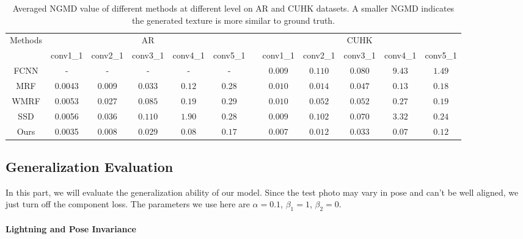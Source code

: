 \documentclass[10pt,twocolumn,letterpaper]{article}
\begin{document}
\begin{table}[htbp]
\begin{center}
{\small
\begin{tabular}{ccccccccccccc}
\hline
\multicolumn{2}{c|}{\multirow {2}{*}{Methods}} &\multicolumn{5}{c}{AR} & & \multicolumn{5}{c}{CUHK} \\
\cline{3-7} \cline{9-13} \multicolumn{2}{c|}{} & conv1\_1 & conv2\_1 & conv3\_1 & conv4\_1 & conv5\_1 & &
 conv1\_1 & conv2\_1 & conv3\_1 & conv4\_1 & conv5\_1  \\
\hline
\multicolumn{2}{c|}{FCNN} & - & - & - & - & - & & { $0.009$} &{ $0.110$} & {$0.080$} & {$9.43$} & {$1.49$}  \\
\multicolumn{2}{c|}{MRF} & 0.0043 & 0.009 & {$0.033$}  & {$0.12$} & 0.28 & & { $0.010$} &{ $0.014$} & {$0.047$} & $0.13$ & $0.18$  \\
\multicolumn{2}{c|}{WMRF} & 0.0053 & 0.027 & {$0.085$}  & {$0.19$} & 0.29 & & { $0.010$} &{ $0.052$} & {$0.052$} & {$0.27$} & {$0.19$}  \\
\multicolumn{2}{c|}{SSD} & 0.0056 & 0.036 & {$0.110$} & {$1.90$} & 0.28 & & { $0.009$} &{ $0.102$} & {$0.070$} & {$3.32$} & {$0.24$}  \\
\multicolumn{2}{c|}{Ours} & {\color{red} 0.0035} & {\color{red} 0.008} & {\color{red} $0.029$} & {\color{red} $0.08$} & {\color{red} $0.17$} & & {\color{red}$0.007$} &{\color{red} $0.012$} & {\color{red} $0.033$} & {\color{red} $0.07$} & {\color{red} $0.12$}  \\
\hline
\end{tabular}
}
\end{center}
\caption{Averaged NGMD value of different methods at different level on AR and CUHK datasets. A smaller NGMD indicates the generated texture is more similar to ground truth.}
\label{tab:NGMD}
\end{table}

\subsection{Generalization Evaluation}

In this part, we will evaluate the generalization ability of our model. Since the test photo may vary in pose and can't be well aligned, we just turn off the component loss. The parameters we use here are $\alpha=0.1$, $\beta_1=1$, $\beta_2=0$. 

\paragraph{Lightning and Pose Invariance} 
\end{document}
